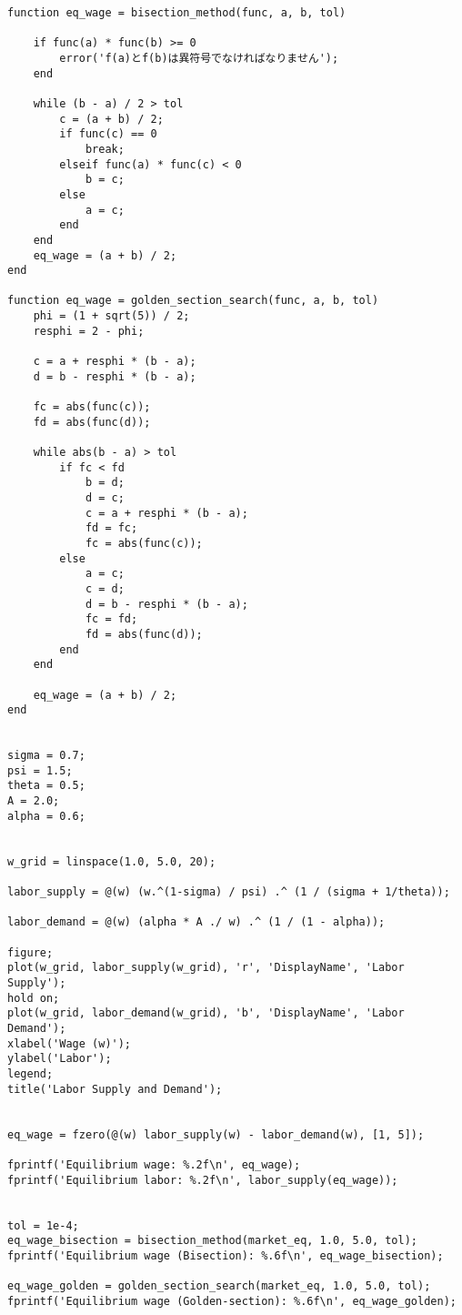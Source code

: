 \documentclass[a4paper]{article}
\begin{document}
\begin{verbatim}
function eq_wage = bisection_method(func, a, b, tol)

    if func(a) * func(b) >= 0
        error('f(a)とf(b)は異符号でなければなりません');
    end

    while (b - a) / 2 > tol
        c = (a + b) / 2;
        if func(c) == 0
            break; 
        elseif func(a) * func(c) < 0
            b = c; 
        else
            a = c;
        end
    end
    eq_wage = (a + b) / 2;
end

function eq_wage = golden_section_search(func, a, b, tol)
    phi = (1 + sqrt(5)) / 2;  
    resphi = 2 - phi;

    c = a + resphi * (b - a);
    d = b - resphi * (b - a);

    fc = abs(func(c));
    fd = abs(func(d));

    while abs(b - a) > tol
        if fc < fd
            b = d;
            d = c;
            c = a + resphi * (b - a);
            fd = fc;
            fc = abs(func(c));
        else
            a = c;
            c = d;
            d = b - resphi * (b - a);
            fc = fd;
            fd = abs(func(d));
        end
    end

    eq_wage = (a + b) / 2; 
end


sigma = 0.7;
psi = 1.5;
theta = 0.5;
A = 2.0;
alpha = 0.6;


w_grid = linspace(1.0, 5.0, 20);

labor_supply = @(w) (w.^(1-sigma) / psi) .^ (1 / (sigma + 1/theta));

labor_demand = @(w) (alpha * A ./ w) .^ (1 / (1 - alpha));

figure;
plot(w_grid, labor_supply(w_grid), 'r', 'DisplayName', 'Labor Supply');
hold on;
plot(w_grid, labor_demand(w_grid), 'b', 'DisplayName', 'Labor Demand');
xlabel('Wage (w)');
ylabel('Labor');
legend;
title('Labor Supply and Demand');


eq_wage = fzero(@(w) labor_supply(w) - labor_demand(w), [1, 5]);

fprintf('Equilibrium wage: %.2f\n', eq_wage);
fprintf('Equilibrium labor: %.2f\n', labor_supply(eq_wage));


tol = 1e-4; 
eq_wage_bisection = bisection_method(market_eq, 1.0, 5.0, tol);
fprintf('Equilibrium wage (Bisection): %.6f\n', eq_wage_bisection);

eq_wage_golden = golden_section_search(market_eq, 1.0, 5.0, tol);
fprintf('Equilibrium wage (Golden-section): %.6f\n', eq_wage_golden);





\end{verbatim}
\end{document}
